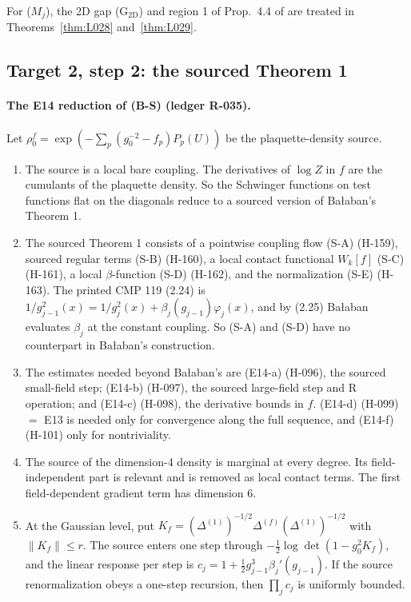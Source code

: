 For ($M_j$), the 2D gap (G$_{\mathrm{2D}}$) and region 1 of Prop.~4.4 of  are treated in Theorems~\ref{thm:L028} and~\ref{thm:L029}.

\subsection{Target 2, step 2: the sourced Theorem 1}\label{sec:src-B11}

\paragraph{The E14 reduction of (B-S) (ledger R-035).}

\begin{proposition}\label{src:SOURCES}
Let $\rho_0^f=\exp(-\sum_p(g_0^{-2}-f_p)P_p(U))$ be the plaquette-density source.
\begin{enumerate}
\item[(a)] The source is a local bare coupling. The derivatives of $\log Z$ in $f$ are the cumulants of the plaquette density. So the Schwinger functions on test functions flat on the diagonals reduce to a sourced version of Ba{\l}aban's Theorem 1.
\item[(b)] The sourced Theorem 1 consists of a pointwise coupling flow (S-A) (H-159), sourced regular terms (S-B) (H-160), a local contact functional $W_k[f]$ (S-C) (H-161), a local $\beta$-function (S-D) (H-162), and the normalization (S-E) (H-163). The printed CMP 119 (2.24) is $1/g_{j-1}^2(x)=1/g_j^2(x)+\beta_j(g_{j-1})\varphi_j(x)$, and by (2.25) Ba{\l}aban evaluates $\beta_j$ at the constant coupling. So (S-A) and (S-D) have no counterpart in Ba{\l}aban's construction.
\item[(c)] The estimates needed beyond Ba{\l}aban's are (E14-a) (H-096), the sourced small-field step; (E14-b) (H-097), the sourced large-field step and R operation; and (E14-c) (H-098), the derivative bounds in $f$. (E14-d) (H-099) $=$ E13 is needed only for convergence along the full sequence, and (E14-f) (H-101) only for nontriviality.
\item[(d)] The source of the dimension-4 density is marginal at every degree. Its field-independent part is relevant and is removed as local contact terms. The first field-dependent gradient term has dimension 6.
\item[(e)] At the Gaussian level, put $K_f=(\Delta^{(1)})^{-1/2}\Delta^{(f)}(\Delta^{(1)})^{-1/2}$ with $\|K_f\|\le r$. The source enters one step through $-\tfrac12\log\det(1-g_0^2K_f)$, and the linear response per step is $c_j=1+\tfrac12g_{j-1}^3\beta_j'(g_{j-1})$. If the source renormalization obeys a one-step recursion, then $\prod_jc_j$ is uniformly bounded.
\end{enumerate}
\end{proposition}

